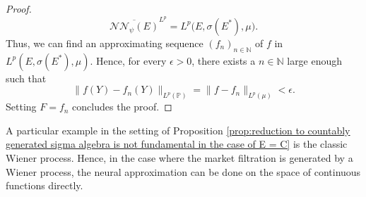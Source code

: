 \documentclass[11pt,a4paper,twoside,openany]{report}
\numberwithin{equation}{section}
\theoremstyle{plain} %
\theoremstyle{definition} %
\theoremstyle{remark} %
\begin{document}
\begin{proof}
    \begin{equation*}
        \overline{\mathcal{NN}_{\psi}(E)}^{L^p}=L^p\big(E,\sigma(E^*),\mu\big).
    \end{equation*}
    Thus, we can find an approximating sequence \((f_n)_{n\in\mathbb{N}}\) of \(f\) in \(L^p(E,\sigma(E^*),\mu)\). Hence, for every \(\epsilon>0\), there exists a \(n\in\mathbb{N}\) large enough such that 
    \begin{equation*}
        \lVert f(Y)-f_n(Y)\rVert_{L^p(\mathbb{P})}=\lVert f-f_n\rVert_{L^p(\mu)}<\epsilon.
    \end{equation*}
    Setting \(F=f_n\) concludes the proof.
\end{proof}
A particular example in the setting of Proposition \ref{prop:reduction to countably generated sigma algebra is not fundamental in the case of E = C} 
is the classic Wiener process. Hence, in the case where the market filtration is generated by a Wiener process, the neural approximation can be done on the space of continuous functions directly. 
\end{document}
